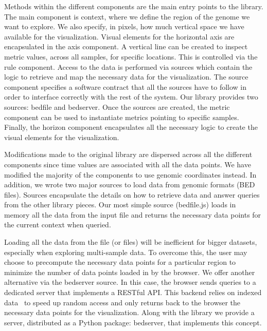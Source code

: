 \documentclass{bioinfo}
\begin{document}

Methods within the different components are the main entry points to the
library. The main component is context, where we define the region of the
genome we want to explore. We also specify, in pixels, how much vertical space
we have available for the visualization. Visual elements for the horizontal
axis are encapsulated in the axis component. A vertical line can be created to
inspect metric values, across all samples, for specific locations. This is
controlled via the rule component. Access to the data is performed via sources
which contain the logic to retrieve and map the necessary data for the
visualization. The source component specifies a software contract that all the
sources have to follow in order to interface correctly with the rest of the
system. Our library provides two sources: bedfile and bedserver. Once the
sources are created, the metric component can be used to instantiate metrics
pointing to specific samples. Finally, the horizon component encapsulates all
the necessary logic to create the visual elements for the visualization.

Modifications made to the original library are dispersed across all the
different components since time values are associated with all the data points.
We have modified the majority of the components to use genomic coordinates
instead. In addition, we wrote two major sources  to load data from genomic
formats (BED files). Sources encapsulate the details on how to retrieve data
and answer queries from the other library pieces. Our most simple source
(bedfile.js) loads in memory all the data from the input file and returns the
necessary data points for the current context when queried.

Loading all the data from the file (or files) will be inefficient for bigger
datasets, especially when exploring multi-sample data. To overcome this, the
user may choose to precompute the necessary data points for a particular region
to minimize the number of data points loaded in by the browser. We offer
another alternative via the bedserver source. In this case, the browser sends
queries to a dedicated server that implements a RESTful API. This backend
relies on indexed data~\citep{tabix-li} to speed up random access and only
returns back to the browser the necessary data points for the visualization.
Along with the library we provide a server, distributed as a Python package:
bedserver, that implements this concept.
\end{document}
